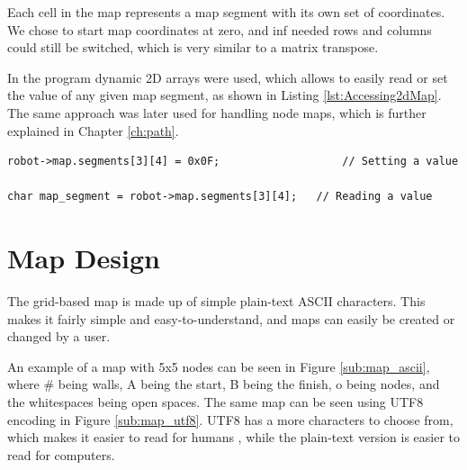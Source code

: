 Each cell in the map represents a map segment with its own set of coordinates. 
We chose to start map coordinates at zero, and inf needed rows and columns could still be switched, 
which is very similar to a matrix transpose. 

In the program dynamic 2D arrays were used, 
which allows to easily read or set the value of any given map segment, as shown in Listing \ref{lst:Accessing2dMap}.
The same approach was later used for handling node maps, which is further explained in Chapter \ref{ch:path}.
 
\begin{lstlisting}[caption={Example of reading or setting a value for coordinate (3,4) in the 2D map array, using structs and pointers. Structs are declared in {\tt defs.h} in Appendix X},label={lst:Accessing2dMap}]
robot->map.segments[3][4] = 0x0F;					// Setting a value

char map_segment = robot->map.segments[3][4];	// Reading a value

\end{lstlisting}
\section{Map Design}
\label{sec:map_design} %
The grid-based map is made up of simple plain-text ASCII characters.
This makes it fairly simple and easy-to-understand, and maps can easily be created or changed by a user. 

An example of a map with 5x5 nodes can be seen in Figure \ref{sub:map_ascii}, 
where \# being walls, A being the start, B being the finish, o being nodes, and the whitespaces being open spaces. 
The same map can be seen using UTF8 encoding in Figure \ref{sub:map_utf8}. 
UTF8 has a more characters to choose from, which makes it easier to read for humans , 
while the plain-text version is easier to read for computers.

